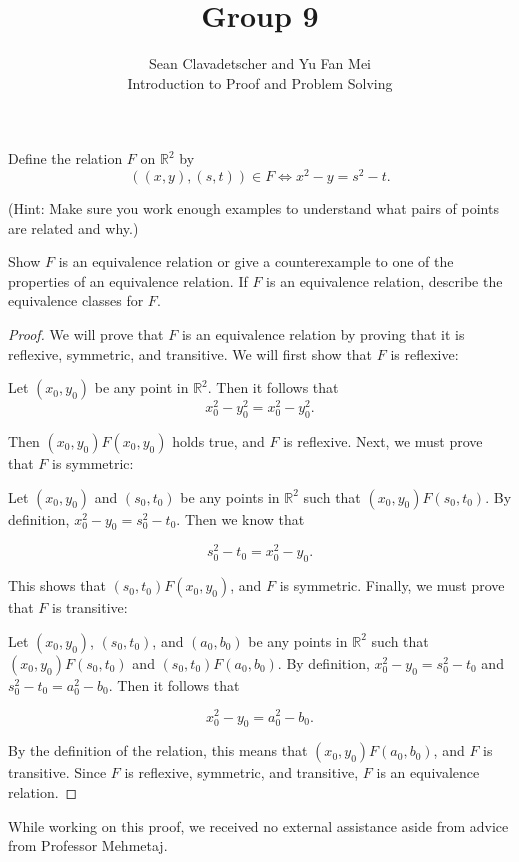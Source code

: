 \documentclass[12pt]{article}
\newenvironment{problem}[2][Problem]{\begin{trivlist}
\item[\hskip \labelsep {\bfseries #1}\hskip \labelsep {\bfseries #2.}]}{\end{trivlist}}
\begin{document}

\title{Group 9}%
\author{Sean Clavadetscher and Yu Fan Mei\\
	Introduction to Proof and Problem Solving} %

\maketitle

\begin{problem}{6}
    Define the relation \(F\) on \(\mathbb{R}^2\) by  
\[
((x, y), (s, t)) \in F \iff x^2 - y = s^2 - t.
\]

(Hint: Make sure you work enough examples to understand what pairs of points are related and why.) 

Show \(F\) is an equivalence relation or give a counterexample to one of the properties of an equivalence relation. If \(F\) is an equivalence relation, describe the equivalence classes for \(F\).
\end{problem}

\begin{proof}
    We will prove that $F$ is an equivalence relation by proving that it is reflexive, symmetric, and transitive. We will first show that $F$ is reflexive:

    Let $(x_0, y_0)$ be any point in $\mathbb{R}^2$. Then it follows that
    $$x_0^2 - y_0^2 = x_0^2 - y_0^2.$$
    
    \noindent
    Then $(x_0, y_0)F(x_0, y_0)$ holds true, and $F$ is reflexive. Next, we must prove that $F$ is symmetric:

    Let $(x_0, y_0)$ and $(s_0, t_0)$ be any points in $\mathbb{R}^2$ such that $(x_0, y_0)F(s_0, t_0)$. By definition, $x_0^2 - y_0 = s_0^2 - t_0$. Then we know that 
    
    $$s_0^2 - t_0 = x_0^2 - y_0.$$

    \noindent
    This shows that $(s_0, t_0)F(x_0, y_0)$, and $F$ is symmetric. Finally, we must prove that $F$ is transitive:

    Let $(x_0, y_0)$, $(s_0, t_0)$, and $(a_0, b_0)$ be any points in $\mathbb{R}^2$ such that $(x_0, y_0)F(s_0, t_0)$ and $(s_0, t_0)F(a_0, b_0)$. By definition, $x_0^2 - y_0 = s_0^2 - t_0$ and $s_0^2 - t_0 = a_0^2 - b_0$. Then it follows that
    
    $$x_0^2 - y_0 = a_0^2 - b_0.$$

    By the definition of the relation, this means that $(x_0, y_0)F(a_0, b_0)$, and $F$ is transitive. Since $F$ is reflexive, symmetric, and transitive, $F$ is an equivalence relation.

\end{proof}

\noindent While working on this proof, we received no external assistance aside from advice from Professor Mehmetaj.
\end{document}
